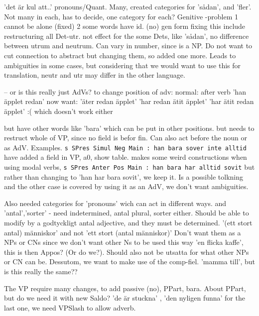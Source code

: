 \documentclass{report}
\begin{document}
'det är kul att..'
pronouns/Quant. Many, created categories for 'sådan', and 'fler'. Not many in each,
has to decide, one category for each?
Genitive -problem 1 cannot be alone (fixed) 2 some words have id. (no) gen form
           fixing this include restructuring all
Det-utr. not effect for the some Dets, like 'sådan', no difference between utrum and neutrum.
 Can vary in number, since is a NP. Do not want to cut connection to abstract but changing them,
 so added one more. Leads to ambiguities in some cases, but considering that we would want to use
 this for translation, neutr and utr may differ in the other language.

-- or is this really just AdVs? 
to change position of adv:
normal: after verb 'han äpplet redan'
now want: 'äter redan äpplet'
          'har redan ätit äpplet' 
          'har ätit redan äpplet' :( which doesn't work either

but have other words like 'bara' which can be put in other positions.
  but needs to restruct whole of VP, since no field is befor fin.
  Can also act before the noun or as AdV. Examples.
\verb|s SPres Simul Neg Main : han bara sover inte alltid|
  have added a field in VP, a0, show table.
  makes some weird constructions when using modal verbs, 
  \verb|s SPres Anter Pos Main : han bara har alltid sovit|
  but rather than changing to 'han har bara sovit', we keep it. Is a possible
  tolkning and the other case is covered by using it as an AdV, we don't want
  ambiguities.

Also needed categories for 'pronouns' wich can act in different ways.
and 'antal','sorter' - need indetermined, antal plural, sorter either.
Should be able to modify by a godtyckligt antal adjective, and they must be determined.
'(ett stort antal) människor' and not 'ett stort (antal människor)'
Don't want them as a NPs or CNs since we don't want other Ns to be used this way
'en flicka kaffe', this is then Appos? (Or do we?). Should also not be utsatta for what other
NPs or CN can be. Dessutom, we want to make use of the comp-fiel. 'mamma till', but is this really
the same??

The VP require many changes, to add passive (no), PPart, bara.
About PPart, but do we need it with new Saldo? 'de är stuckna' , 'den nyligen funna'
for the last one, we need VPSlash to allow adverb.
\end{document}
